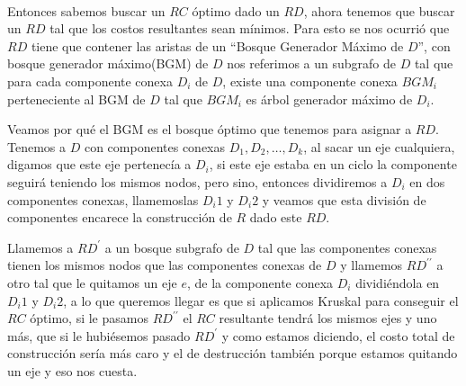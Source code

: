 \\
\par
Entonces sabemos buscar un $RC$ óptimo dado un $RD$, ahora tenemos que buscar un $RD$ tal que los costos resultantes sean mínimos. Para esto se nos ocurrió que $RD$ tiene que contener las aristas de un “Bosque Generador Máximo de $D$”, con bosque generador máximo(BGM) de $D$ nos referimos a un subgrafo de $D$ tal que para cada componente conexa $D_i$ de $D$, existe una componente conexa $BGM_i$ perteneciente al BGM de $D$ tal que $BGM_i$ es árbol generador máximo de $D_i$. 
\\
\par
Veamos por qué el BGM es el bosque óptimo que tenemos para asignar a $RD$. Tenemos a $D$ con componentes conexas $D_1 , D_2 , … , D_k$, al sacar un eje cualquiera, digamos que este eje pertenecía a $D_i$, si este eje estaba en un ciclo la componente seguirá teniendo los mismos nodos, pero sino, entonces dividiremos a $D_i$ en dos componentes conexas, llamemoslas $D_i1$ y $D_i2$ y veamos que esta división de componentes encarece la construcción de $R$ dado este $RD$. 
\\
\par
Llamemos a $RD^{\prime}$ a un bosque subgrafo de $D$ tal que las componentes conexas tienen los mismos nodos que las componentes conexas de $D$ y llamemos $RD^{\prime\prime}$ a otro tal que le quitamos un eje $e$, de la componente conexa $D_i$ dividiéndola en $D_i1$ y $D_i2$, a lo que queremos llegar es que si aplicamos Kruskal para conseguir el $RC$ óptimo, si le pasamos $RD^{\prime\prime}$ el $RC$ resultante tendrá los mismos ejes y uno más, que si le hubiésemos pasado $RD^{\prime}$ y como estamos diciendo, el costo total de construcción sería más caro y el de destrucción también porque estamos quitando un eje y eso nos cuesta.
\\
\par
